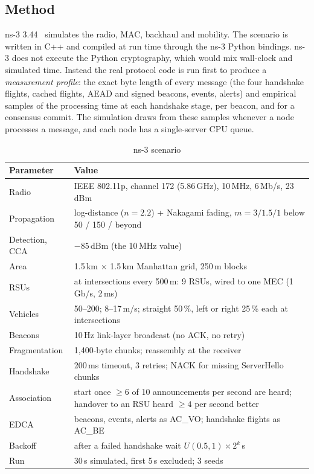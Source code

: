 \subsection{Method}

ns-3 3.44~\cite{ns3} simulates the radio, MAC, backhaul and mobility. The
scenario is written in C++ and compiled at run time through the ns-3 Python
bindings. ns-3 does not execute the Python cryptography, which would mix
wall-clock and simulated time. Instead the real protocol code is run first to
produce a \emph{measurement profile}: the exact byte length of every message
(the four handshake flights, cached flights, AEAD and signed beacons, events,
alerts) and empirical samples of the processing time at each handshake stage,
per beacon, and for a consensus commit. The simulation draws from these
samples whenever a node processes a message, and each node has a
single-server CPU queue.

\begin{table}[h]
\centering
\caption{ns-3 scenario}
\label{tab:ns3}
\begin{tabular}{@{}p{4.2cm}p{9.8cm}@{}}
\toprule
Parameter & Value \\
\midrule
Radio & IEEE 802.11p, channel 172 (5.86\,GHz), 10\,MHz, 6\,Mb/s, 23\,dBm \\
Propagation & log-distance ($n = 2.2$) + Nakagami fading, $m = 3 / 1.5 / 1$ below 50 / 150 / beyond~\cite{torrent} \\
Detection, CCA & $-85$\,dBm (the 10\,MHz value) \\
Area & 1.5\,km $\times$ 1.5\,km Manhattan grid, 250\,m blocks \\
RSUs & at intersections every 500\,m: 9 RSUs, wired to one MEC (1\,Gb/s, 2\,ms) \\
Vehicles & 50--200; 8--17\,m/s; straight 50\,\%, left or right 25\,\% each at intersections \\
Beacons & 10\,Hz link-layer broadcast (no ACK, no retry) \\
Fragmentation & 1,400-byte chunks; reassembly at the receiver \\
Handshake & 200\,ms timeout, 3 retries; NACK for missing ServerHello chunks \\
Association & start once $\ge 6$ of 10 announcements per second are heard; handover to an RSU heard $\ge 4$ per second better \\
EDCA & beacons, events, alerts as AC\_VO; handshake flights as AC\_BE \\
Backoff & after a failed handshake wait $U(0.5, 1) \times 2^k$\,s \\
Run & 30\,s simulated, first 5\,s excluded; 3 seeds \\
\bottomrule
\end{tabular}
\end{table}

